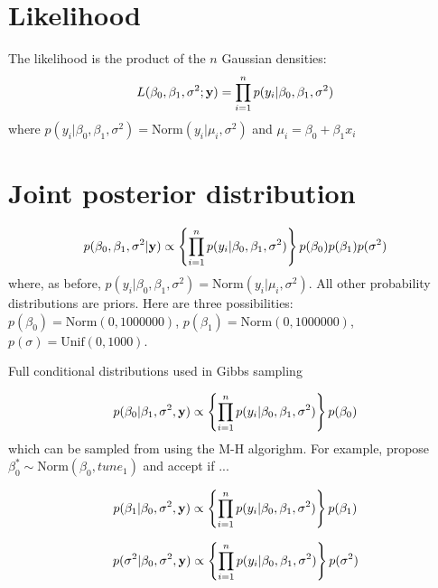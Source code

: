\documentclass[12pt]{article}
\begin{document}
\section{Likelihood}

The likelihood is the product of the $n$ Gaussian densities:
\[
  L(\beta_0,\beta_1,\sigma^2; {\bf y}) = \prod_{i=1}^n p(y_i|\beta_0,\beta_1,\sigma^2)
\]
where $p(y_i|\beta_0,\beta_1,\sigma^2) = \mathrm{Norm}(y_i|\mu_i,\sigma^2)$ and $\mu_i = \beta_0 + \beta_1x_i$


\section{Joint posterior distribution}


\[
  p(\beta_0,\beta_1,\sigma^2 | {\bf y}) \propto \left\{\prod_{i=1}^n p(y_i|\beta_0,\beta_1,\sigma^2)\right\}p(\beta_0)p(\beta_1)p(\sigma^2)
\]
where, as before, $p(y_i|\beta_0,\beta_1,\sigma^2) = \mathrm{Norm}(y_i|\mu_i,\sigma^2)$. All other probability distributions are priors. Here are three possibilities: $p(\beta_0) = \mathrm{Norm}(0,1000000)$, $p(\beta_1) = \mathrm{Norm}(0,1000000)$, $p(\sigma) = \mathrm{Unif}(0,1000)$. 

Full conditional distributions used in Gibbs sampling


\[
  p(\beta_0|\beta_1,\sigma^2,{\bf y}) \propto \left\{\prod_{i=1}^n p(y_i|\beta_0,\beta_1,\sigma^2)\right\}p(\beta_0)
\]
which can be sampled from using the M-H algorighm. For example, propose $\beta_0^{*} \sim \mathrm{Norm}(\beta_0, tune_1)$ and accept if ...

\[
  p(\beta_1|\beta_0,\sigma^2,{\bf y}) \propto \left\{\prod_{i=1}^n p(y_i|\beta_0,\beta_1,\sigma^2)\right\}p(\beta_1)
\]

\[
  p(\sigma^2|\beta_0,\sigma^2,{\bf y}) \propto \left\{\prod_{i=1}^n p(y_i|\beta_0,\beta_1,\sigma^2)\right\}p(\sigma^2)
\]
\end{document}
